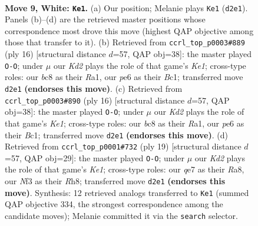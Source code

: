 \documentclass[11pt]{article}
\begin{document}
\clearpage

\begin{figure}[p]\centering
\begin{subfigure}{0.46\textwidth}\centering
\resizebox{\linewidth}{!}{%
\newchessgame
\chessboard[
  setfen={r1b2rk1/ppppqpp1/2n1pn2/7p/2PP4/2B2NP1/PP1KPP1P/R2Q1B1R w - - 2 9},
  showmover=false,
  pgfstyle=straightmove, color=movearrow, markmove={d2-e1}
]}
\caption{}
\end{subfigure}\hfill
\begin{subfigure}{0.46\textwidth}\centering
\resizebox{\linewidth}{!}{%
\newchessgame
\chessboard[
  setfen={r1bq1rk1/p1p2ppp/1pnp1n2/4p3/2P1P3/P1PP1N2/4BPPP/R1BQK2R w KQ - 2 9},
  showmover=false,
  pgfstyle=straightmove, color=movearrow, markmove={e1-g1}
]}
\caption{}
\end{subfigure}
\\[4pt]
\begin{subfigure}{0.46\textwidth}\centering
\resizebox{\linewidth}{!}{%
\newchessgame
\chessboard[
  setfen={r1bq1rk1/p1p2ppp/1pnp1n2/4p3/2P1P3/P1PP1N2/4BPPP/R1BQK2R w KQ - 2 9},
  showmover=false,
  pgfstyle=straightmove, color=movearrow, markmove={e1-g1}
]}
\caption{}
\end{subfigure}\hfill
\begin{subfigure}{0.46\textwidth}\centering
\resizebox{\linewidth}{!}{%
\newchessgame
\chessboard[
  setfen={r1bqk2r/pp2bppp/3ppn2/8/3PP3/2NQ1N1P/PP3PP1/R1B2RK1 b kq - 2 10},
  showmover=false,
  pgfstyle=straightmove, color=movearrow, markmove={e8-g8}
]}
\caption{}
\end{subfigure}
\caption{\textbf{Move 9, White: \texttt{Ke1}.} (a) Our position; Melanie plays \texttt{Ke1} (\texttt{d2e1}). Panels (b)--(d) are the retrieved master positions whose correspondence most drove this move (highest QAP objective among those that transfer to it). (b) Retrieved from \texttt{ccrl\_top\_p0003\#889} (ply 16) [structural distance $d$=57, QAP obj=38]: the master played \texttt{O-O}; under $\mu$ our \emph{Kd2} plays the role of that game's \emph{Ke1}; cross-type roles: our \emph{b}c8 as their \emph{R}a1, our \emph{p}e6 as their \emph{B}c1; transferred move \texttt{d2e1} \textbf{(endorses this move)}. (c) Retrieved from \texttt{ccrl\_top\_p0003\#890} (ply 16) [structural distance $d$=57, QAP obj=38]: the master played \texttt{O-O}; under $\mu$ our \emph{Kd2} plays the role of that game's \emph{Ke1}; cross-type roles: our \emph{b}c8 as their \emph{R}a1, our \emph{p}e6 as their \emph{B}c1; transferred move \texttt{d2e1} \textbf{(endorses this move)}. (d) Retrieved from \texttt{ccrl\_top\_p0001\#732} (ply 19) [structural distance $d$=57, QAP obj=29]: the master played \texttt{O-O}; under $\mu$ our \emph{Kd2} plays the role of that game's \emph{Ke1}; cross-type roles: our \emph{q}e7 as their \emph{R}a8, our \emph{N}f3 as their \emph{R}h8; transferred move \texttt{d2e1} \textbf{(endorses this move)}. Synthesis: 12 retrieved analogs transferred to \texttt{Ke1} (summed QAP objective 334, the strongest correspondence among the candidate moves); Melanie committed it via the \texttt{search} selector.}
\label{fig:thought-m16}
\end{figure}
\end{document}
